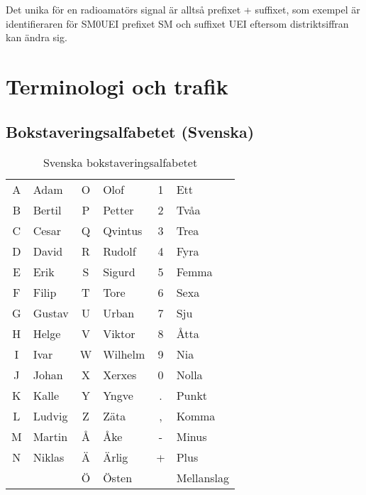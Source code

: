 Det unika för en radioamatörs signal är alltså prefixet + suffixet,
som exempel är identifieraren för SM0UEI prefixet SM och suffixet UEI
eftersom distriktsiffran kan ändra sig.

\clearpage


\section{Terminologi och trafik}

\subsection{Bokstaveringsalfabetet (Svenska)}

\begin{table}[H]
	\centering
\begin{longtable}{cl|cl|cl }
	A & Adam   & O & Olof    & 1 & Ett        \\
	B & Bertil & P & Petter  & 2 & Tvåa       \\
	C & Cesar  & Q & Qvintus & 3 & Trea       \\
	D & David  & R & Rudolf  & 4 & Fyra       \\
	E & Erik   & S & Sigurd  & 5 & Femma      \\
	F & Filip  & T & Tore    & 6 & Sexa       \\
	G & Gustav & U & Urban   & 7 & Sju        \\
	H & Helge  & V & Viktor  & 8 & Åtta       \\
	I & Ivar   & W & Wilhelm & 9 & Nia        \\
	J & Johan  & X & Xerxes  & 0 & Nolla      \\
	K & Kalle  & Y & Yngve   & . & Punkt      \\
	L & Ludvig & Z & Zäta    & , & Komma      \\
	M & Martin & Å & Åke     & - & Minus      \\
	N & Niklas & Ä & Ärlig   & + & Plus       \\
	  &        & Ö & Östen   &   & Mellanslag \\
\end{longtable}
\caption{Svenska bokstaveringsalfabetet}
\end{table}

